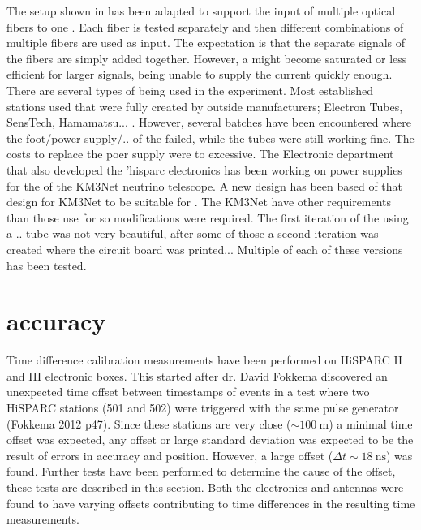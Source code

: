 The setup shown in  has been
adapted to support the input of multiple optical fibers to one \pmt.
Each fiber is tested separately and then different combinations of
multiple fibers are used as input. The expectation is that the separate
signals of the fibers are simply added together. However, a \pmt might
become saturated or less efficient for larger signals, being unable to
supply the current quickly enough. There are several types of \pmt being
used in the \hisparc experiment. Most established stations used \pmts
that were fully created by outside manufacturers; Electron Tubes,
SensTech, Hamamatsu... . However,
several batches have been encountered where the foot/power supply/.. of
the \pmt failed, while the tubes were still working fine. The costs to
replace the poer supply were to excessive. The \nikhef Electronic
department that also developed the 'hisparc electronics has been working
on \pmt power supplies for the \pmts of the KM3Net neutrino telescope. A
new design has been based of that design for KM3Net to be suitable for
\hisparc. The KM3Net \pmts have other requirements than those use for
\hisparc so modifications were required. The first iteration of the
\hisparc \pmt using a .. tube was not very
beautiful, after some of those a second iteration was created where the
circuit board was printed... Multiple \pmts of each of these versions
has been tested.






\section{\gps accuracy}
\label{sec:gps_accuracy}

Time difference calibration measurements have been performed on
HiSPARC II and III electronic boxes. This started after dr. David
Fokkema discovered an unexpected time offset between timestamps of
events in a test where two HiSPARC stations (501 and 502) were triggered
with the same pulse generator (Fokkema 2012 p47). Since these stations
are very close ($\sim\SI{100}{\meter}$) a minimal time offset was
expected, any offset or large standard deviation was expected to be the
result of errors in \gps accuracy and position. However, a large offset
($\Delta t \sim\SI{18}{\nano\second}$) was found. Further tests have
been performed to determine the cause of the offset, these tests are
described in this section. Both the \hisparc electronics and \gps
antennas were found to have varying offsets contributing to time
differences in the resulting time measurements.


